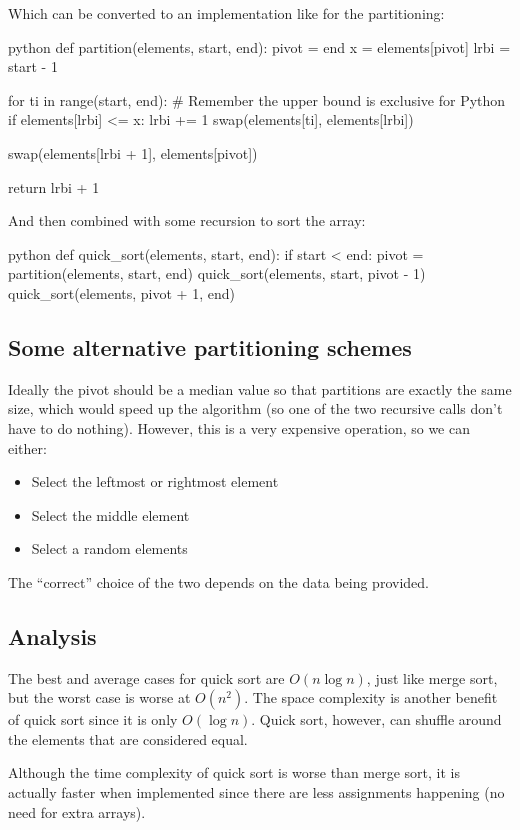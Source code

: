Which can be converted to an implementation like for the partitioning:
\begin{code}{python}
    def partition(elements, start, end):
        pivot = end
        x = elements[pivot]
        lrbi = start - 1

        for ti in range(start, end):  # Remember the upper bound is exclusive for Python
            if elements[lrbi] <= x:
                lrbi += 1
                swap(elements[ti], elements[lrbi])           

        swap(elements[lrbi + 1], elements[pivot])

        return lrbi + 1
\end{code}
And then combined with some recursion to sort the array:
\begin{code}{python}
    def quick_sort(elements, start, end):
        if start < end:
            pivot = partition(elements, start, end)
            quick_sort(elements, start, pivot - 1)
            quick_sort(elements, pivot + 1, end)
\end{code}

\subsection{Some alternative partitioning schemes}\label{sub:some_alternative_partitioning_schemes}

Ideally the pivot should be a median value so that partitions are exactly the same size, which would speed up the algorithm (so one of the two recursive calls don't have to do nothing).
However, this is a very expensive operation, so we can either:
\begin{itemize}
    \item Select the leftmost or rightmost element
    \item Select the middle element
    \item Select a random elements
\end{itemize}
The ``correct'' choice of the two depends on the data being provided.

\subsection{Analysis}\label{sub:analysis_quick_sort}

The best and average cases for quick sort are \(O(n \log n)\), just like merge sort, but the worst case is worse at \(O(n^2)\).
The space complexity is another benefit of quick sort since it is only \(O(\log n)\).
Quick sort, however, can shuffle around the elements that are considered equal.
\begin{note}
    Although the time complexity of quick sort is worse than merge sort, it is actually faster when implemented since there are less assignments happening (no need for extra arrays).
\end{note}

